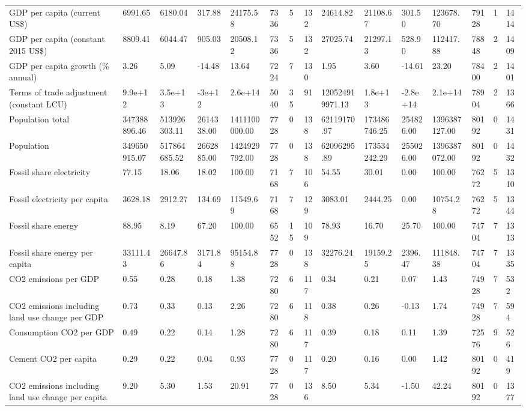 \begin{longtable}{lllllllllllllll}
GDP per capita (current US\$) & 6991.65 & 6180.04 & 317.88 & 24175.58 & 7336 & 5 & 132 & 24614.82 & 21108.67 & 301.50 & 123678.70 & 79128 & 1 & 1414\\
GDP per capita (constant 2015 US\$) & 8809.41 & 6044.47 & 905.03 & 20508.12 & 7336 & 5 & 132 & 27025.74 & 21297.13 & 528.90 & 112417.88 & 78848 & 2 & 1409\\
GDP per capita growth (\% annual) & 3.26 & 5.09 & -14.48 & 13.64 & 7224 & 7 & 130 & 1.95 & 3.60 & -14.61 & 23.20 & 78400 & 2 & 1401\\
\addlinespace
Terms of trade adjustment (constant LCU) & 9.9e+12 & 3.5e+13 & -3e+12 & 2.6e+14 & 5040 & 35 & 91 & 120524919971.13 & 1.8e+13 & -2.8e+14 & 2.1e+14 & 78904 & 2 & 1366\\
Population total & 347388896.46 & 513926303.11 & 2614338.00 & 1411100000.00 & 7728 & 0 & 138 & 62119170.97 & 173486746.25 & 254826.00 & 1396387127.00 & 80192 & 0 & 1431\\
Population & 349650915.07 & 517864685.52 & 2662885.00 & 1424929792.00 & 7728 & 0 & 138 & 62096295.89 & 173534242.29 & 255026.00 & 1396387072.00 & 80192 & 0 & 1432\\
Fossil share electricity & 77.15 & 18.06 & 18.02 & 100.00 & 7168 & 7 & 106 & 54.55 & 30.01 & 0.00 & 100.00 & 76272 & 5 & 1310\\
Fossil electricity per capita & 3628.18 & 2912.27 & 134.69 & 11549.69 & 7168 & 7 & 129 & 3083.01 & 2444.25 & 0.00 & 10754.28 & 76272 & 5 & 1344\\
\addlinespace
Fossil share energy & 88.95 & 8.19 & 67.20 & 100.00 & 6552 & 15 & 109 & 78.93 & 16.70 & 25.70 & 100.00 & 74704 & 7 & 1313\\
Fossil share energy per capita & 33111.43 & 26647.86 & 3171.84 & 95154.88 & 7728 & 0 & 138 & 32276.24 & 19159.25 & 2396.47 & 111848.38 & 74704 & 7 & 1335\\
CO2 emissions per GDP & 0.55 & 0.28 & 0.18 & 1.38 & 7280 & 6 & 117 & 0.34 & 0.21 & 0.07 & 1.43 & 74928 & 7 & 532\\
CO2 emissions including land use change per GDP & 0.73 & 0.33 & 0.13 & 2.26 & 7280 & 6 & 118 & 0.38 & 0.26 & -0.13 & 1.74 & 74928 & 7 & 594\\
Consumption CO2 per GDP & 0.49 & 0.22 & 0.14 & 1.28 & 7280 & 6 & 117 & 0.39 & 0.18 & 0.11 & 1.39 & 72576 & 9 & 526\\
\addlinespace
Cement CO2 per capita & 0.29 & 0.22 & 0.04 & 0.93 & 7728 & 0 & 117 & 0.20 & 0.16 & 0.00 & 1.42 & 80192 & 0 & 419\\
CO2 emissions including land use change per capita & 9.20 & 5.30 & 1.53 & 20.91 & 7728 & 0 & 136 & 8.50 & 5.34 & -1.50 & 42.24 & 80192 & 0 & 1377\\

\end{longtable}
